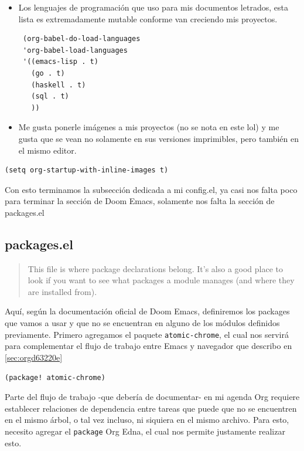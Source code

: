 \documentclass[11pt]{article}
\begin{document}
\begin{itemize}
\item Los lenguajes de programación que uso para mis documentos letrados, esta lista es extremadamente mutable conforme van creciendo mis proyectos.

\begin{verbatim}
 (org-babel-do-load-languages
 'org-babel-load-languages
 '((emacs-lisp . t)
   (go . t)
   (haskell . t)
   (sql . t)
   ))
\end{verbatim}

\item Me gusta ponerle imágenes a mis proyectos (no se nota en este lol) y me gusta que se vean no solamente en sus versiones imprimibles, pero también en el mismo editor.
\end{itemize}

\begin{verbatim}
(setq org-startup-with-inline-images t)
\end{verbatim}

Con esto terminamos la subsección dedicada a mi config.el, ya casi nos falta poco para terminar la sección de Doom Emacs, solamente nos falta la sección de packages.el
\subsection{packages.el}
\label{sec:org639069c}

\begin{quote}
This file is where package declarations belong. It’s also a good place to look if you want to see what packages a module manages (and where they are installed from).
\end{quote}

Aquí, según la documentación oficial de Doom Emacs, definiremos los packages que vamos a usar y que no se encuentran en alguno de los módulos definidos previamente. Primero agregamos el paquete \texttt{atomic-chrome}, el cual nos servirá para complementar el flujo de trabajo entre Emacs y navegador que describo en \ref{sec:orgd63220e}

\begin{verbatim}
(package! atomic-chrome)
\end{verbatim}

Parte del flujo de trabajo -que debería de documentar- en mi agenda Org requiere establecer relaciones de dependencia entre tareas que puede que no se encuentren en el mismo árbol, o tal vez incluso, ni siquiera en el mismo archivo. Para esto, necesito agregar el \texttt{package} Org Edna, el cual nos permite justamente realizar esto.
\end{document}
